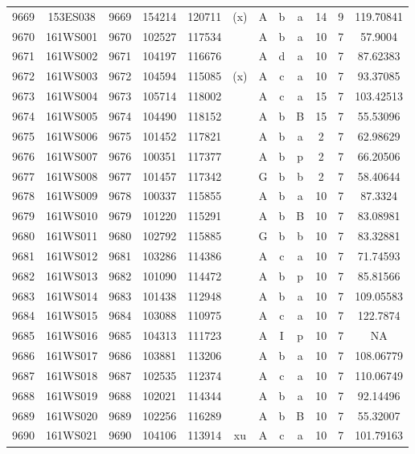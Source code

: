 \begin{tabular}{|*{12}{c|}}
9669 & 153ES038 & 9669 & 154214 & 120711 & (x) & A & b & a & 14 & 9 & 119.70841 \\ 
9670 & 161WS001 & 9670 & 102527 & 117534 &  & A & b & a & 10 & 7 & 57.9004 \\ 
9671 & 161WS002 & 9671 & 104197 & 116676 &  & A & d & a & 10 & 7 & 87.62383 \\ 
9672 & 161WS003 & 9672 & 104594 & 115085 & (x) & A & c & a & 10 & 7 & 93.37085 \\ 
9673 & 161WS004 & 9673 & 105714 & 118002 &  & A & c & a & 15 & 7 & 103.42513 \\ 
9674 & 161WS005 & 9674 & 104490 & 118152 &  & A & b & B & 15 & 7 & 55.53096 \\ 
9675 & 161WS006 & 9675 & 101452 & 117821 &  & A & b & a & 2 & 7 & 62.98629 \\ 
9676 & 161WS007 & 9676 & 100351 & 117377 &  & A & b & p & 2 & 7 & 66.20506 \\ 
9677 & 161WS008 & 9677 & 101457 & 117342 &  & G & b & b & 2 & 7 & 58.40644 \\ 
9678 & 161WS009 & 9678 & 100337 & 115855 &  & A & b & a & 10 & 7 & 87.3324 \\ 
9679 & 161WS010 & 9679 & 101220 & 115291 &  & A & b & B & 10 & 7 & 83.08981 \\ 
9680 & 161WS011 & 9680 & 102792 & 115885 &  & G & b & b & 10 & 7 & 83.32881 \\ 
9681 & 161WS012 & 9681 & 103286 & 114386 &  & A & c & a & 10 & 7 & 71.74593 \\ 
9682 & 161WS013 & 9682 & 101090 & 114472 &  & A & b & p & 10 & 7 & 85.81566 \\ 
9683 & 161WS014 & 9683 & 101438 & 112948 &  & A & b & a & 10 & 7 & 109.05583 \\ 
9684 & 161WS015 & 9684 & 103088 & 110975 &  & A & c & a & 10 & 7 & 122.7874 \\ 
9685 & 161WS016 & 9685 & 104313 & 111723 &  & A & I & p & 10 & 7 & NA \\ 
9686 & 161WS017 & 9686 & 103881 & 113206 &  & A & b & a & 10 & 7 & 108.06779 \\ 
9687 & 161WS018 & 9687 & 102535 & 112374 &  & A & c & a & 10 & 7 & 110.06749 \\ 
9688 & 161WS019 & 9688 & 102021 & 114344 &  & A & b & a & 10 & 7 & 92.14496 \\ 
9689 & 161WS020 & 9689 & 102256 & 116289 &  & A & b & B & 10 & 7 & 55.32007 \\ 
9690 & 161WS021 & 9690 & 104106 & 113914 & xu & A & c & a & 10 & 7 & 101.79163 \\ 

\end{tabular}
